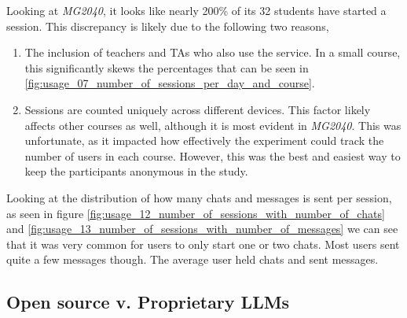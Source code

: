 





Looking at \textit{MG2040}, it looks like nearly 200\% of its 32 students have started a session. This discrepancy is likely due to the following two reasons,


\begin{enumerate}
        \item The inclusion of teachers and TAs who also use the service. In a small course, this significantly skews the percentages that can be seen in \autoref{fig:usage_07_number_of_sessions_per_day_and_course}.
        \item Sessions are counted uniquely across different devices. This factor likely affects other courses as well, although it is most evident in \textit{MG2040}. This was unfortunate, as it impacted how effectively the experiment could track the number of users in each course. However, this was the best and easiest way to keep the participants anonymous in the study.
\end{enumerate}




Looking at the distribution of how many chats and messages is sent per session, as seen in figure \autoref{fig:usage_12_number_of_sessions_with_number_of_chats} and \autoref{fig:usage_13_number_of_sessions_with_number_of_messages} we can see that it was very common for users to only start one or two chats. Most users sent quite a few messages though. The average user held chats and sent messages.








\subsection{Open source v. Proprietary LLMs}


